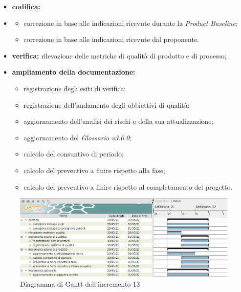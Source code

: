 \begin{itemize}
    \item\textbf{codifica:}
    \item \begin{itemize}
              \item correzione in base alle indicazioni ricevute durante la \textit{Product Baseline};
              \item correzione in base alle indicazioni ricevute dal proponente.
          \end{itemize}
    \item \textbf{verifica:} rilevazione delle metriche di qualità di prodotto e di processo;
    \item \textbf{ampliamento della documentazione:}
          \begin{itemize}
              \item registrazione degli esiti di verifica;
              \item registrazione dell'andamento degli obbiettivi di qualità;
              \item aggiornamento dell'analisi dei rischi e della sua attualizzazione;
              \item aggiornamento del \textit{Glossario v3.0.0};
              \item calcolo del consuntivo di periodo;
              \item calcolo del preventivo a finire rispetto alla fase;
              \item calcolo del preventivo a finire rispetto al completamento del progetto.
          \end{itemize}
\end{itemize}
\begin{figure}[!ht]
    \caption{Diagramma di Gantt dell'incremento 13}
    \vspace{5px}
    \includegraphics[scale=0.3]{../../../Images/Diagrammi/Gantt/incremento13.png}
    \centering
\end{figure}

